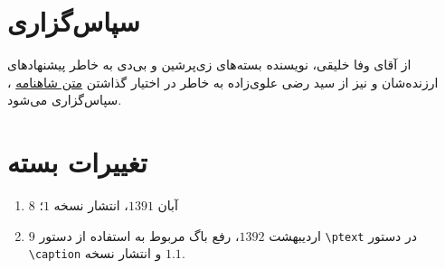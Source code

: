 \documentclass[a4paper,12pt]{article}
\begin{document}
\section{سپاس‌گزاری}
از آقای وفا خلیقی، نویسنده بسته‌های زی‌پرشین و بی‌دی به خاطر پیشنهادهای ارزنده‌شان
و نیز از سید رضی علوی‌زاده  به خاطر در اختیار گذاشتن 
\href{http://saaghar.pozh.org/}{متن شاهنامه}%
، 
 سپاس‌گزاری می‌شود. 
\section*{تغییرات بسته}
\begin{enumerate}
\item
$8$ آبان $1391$، انتشار نسخه $1$؛
\item
$9$ اردیبهشت $1392$، رفع باگ مربوط به استفاده از دستور \verb!\ptext! در دستور \verb!\caption! و انتشار نسخه $1.1$.
\end{enumerate}
\end{document}
